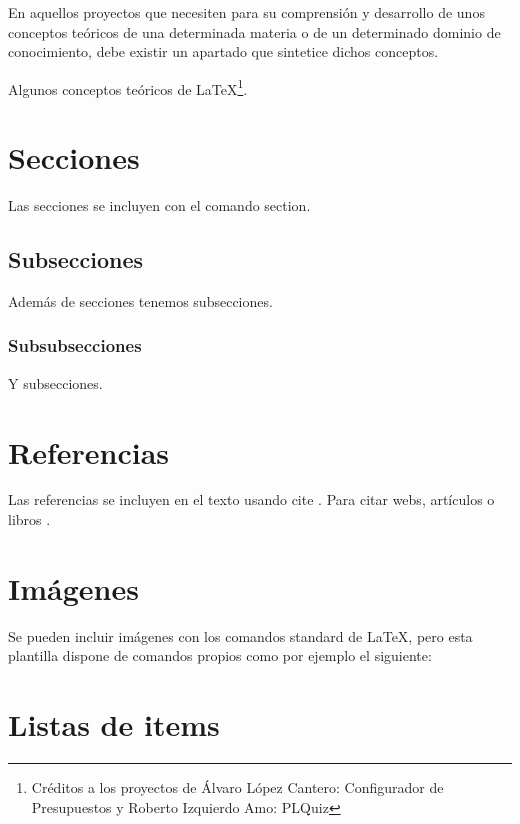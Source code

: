 
En aquellos proyectos que necesiten para su comprensión y desarrollo de unos conceptos teóricos de una determinada materia o de un determinado dominio de conocimiento, debe existir un apartado que sintetice dichos conceptos.

Algunos conceptos teóricos de \LaTeX \footnote{Créditos a los proyectos de Álvaro López Cantero: Configurador de Presupuestos y Roberto Izquierdo Amo: PLQuiz}.



\section{Secciones}

Las secciones se incluyen con el comando section.

\subsection{Subsecciones}

Además de secciones tenemos subsecciones.

\subsubsection{Subsubsecciones}

Y subsecciones. 


\section{Referencias}

Las referencias se incluyen en el texto usando cite \cite{wiki:latex}. Para citar webs, artículos o libros \cite{koza92}.


\section{Imágenes}

Se pueden incluir imágenes con los comandos standard de \LaTeX, pero esta plantilla dispone de comandos propios como por ejemplo el siguiente:




\section{Listas de items}


